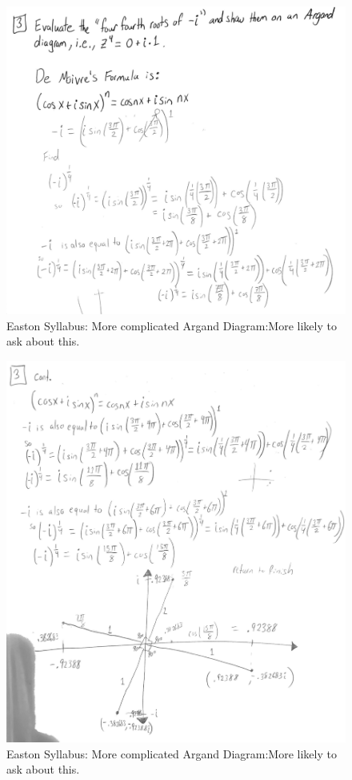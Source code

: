 \documentclass{article}
\begin{document}
\begin{figure}[h!]
\centering
\includegraphics[scale=.65]{Fourier/Week 2/HW/Argand_3.1.png}
\caption{Easton Syllabus: More complicated Argand Diagram:More likely to ask about this. }
\label{fig:Snowman}
\end{figure}

\begin{figure}[h!]
\centering
\includegraphics[scale=.65]{Fourier/Week 2/HW/Argand_3.2.png}
\caption{Easton Syllabus: More complicated Argand Diagram:More likely to ask about this. }
\label{fig:Snowman}
\end{figure}
\end{document}
